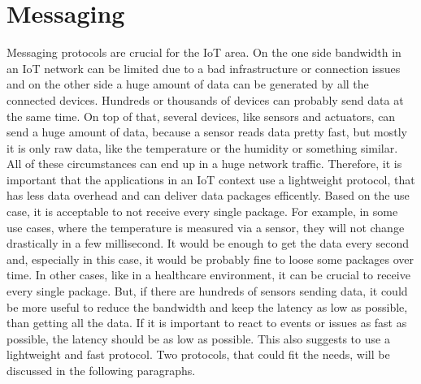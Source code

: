 \section{Messaging}
Messaging protocols are crucial for the \ac{IoT} area.
On the one side bandwidth in an \ac{IoT} network can be limited due to a bad infrastructure or connection issues and on the other side a huge amount of data can be generated by all the connected devices.
Hundreds or thousands of devices can probably send data at the same time.
On top of that, several devices, like sensors and actuators, can send a huge amount of data, because a sensor reads data pretty fast, but mostly it is only raw data, like the temperature or the humidity or something similar.
All of these circumstances can end up in a huge network traffic.
Therefore, it is important that the applications in an \ac{IoT} context use a lightweight protocol, that has less data overhead and can deliver data packages efficently.
Based on the use case, it is acceptable to not receive every single package.
For example, in some use cases, where the temperature is measured via a sensor, they will not change drastically in a few millisecond.
It would be enough to get the data every second and, especially in this case, it would be probably fine to loose some packages over time.
In other cases, like in a healthcare environment, it can be crucial to receive every single package.
But, if there are hundreds of sensors sending data, it could be more useful to reduce the bandwidth and keep the latency as low as possible, than getting all the data.
If it is important to react to events or issues as fast as possible, the latency should be as low as possible.
This also suggests to use a lightweight and fast protocol.
Two protocols, that could fit the needs, will be discussed in the following paragraphs.

